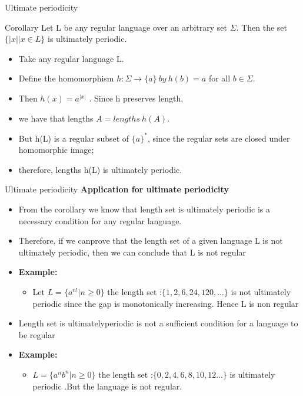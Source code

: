 \documentclass{beamer}
\begin{document}
\begin{frame}{Ultimate periodicity}
	\begin{block}{Corollary }
		Let L be any regular language over an arbitrary set $\Sigma$. Then the set $\{|x| \big| x \in L\}$ is ultimately	periodic.
	\end{block}
\proofname 
\begin{itemize}
	\item Take any regular language L.
	\item Define the homomorphism $h : \Sigma \rightarrow \{a\}\  by\  h(b) = a$ for all $b \in \Sigma$. 
	\item Then $h(x) = a^{|x|}$ . Since h preserves length, 
	\item we have that lengths $A =	lengths\  h(A)$. 
	\item But h(L) is a regular subset of $\{a\}^*$, since the regular 
		sets are closed under homomorphic image; 
	\item therefore, lengths h(L) is ultimately periodic.	
\end{itemize}
\end{frame}
\begin{frame}{Ultimate periodicity}
	\textbf{Application for ultimate periodicity}
	\begin{itemize}
		\item From the corollary we know that length set is ultimately periodic is a necessary condition for any regular language.
		\item Therefore, if we canprove that the length set of a given language L is not ultimately periodic, then we can conclude that L is not regular
		\item \textbf{Example:} 
		\begin{itemize}
			\item Let $L=\{a^{n!}\big| n\geq 0\}$  the length set :$\{1,2,6,24,120,...\}$ is  not ultimately periodic since the gap is monotonically increasing. Hence L is non regular
		\end{itemize}
	\item Length set is ultimatelyperiodic is not a sufficient condition for a language to be regular
	\item \textbf{Example:}
	\begin{itemize}
		\item  $L=\{a^nb^n\big| n\geq 0\}$  the length set :$\{0,2,4,6,8,10,12...\}$ is  ultimately periodic .But the language is not regular.
	\end{itemize}
	\end{itemize}
\end{frame}
\end{document}

